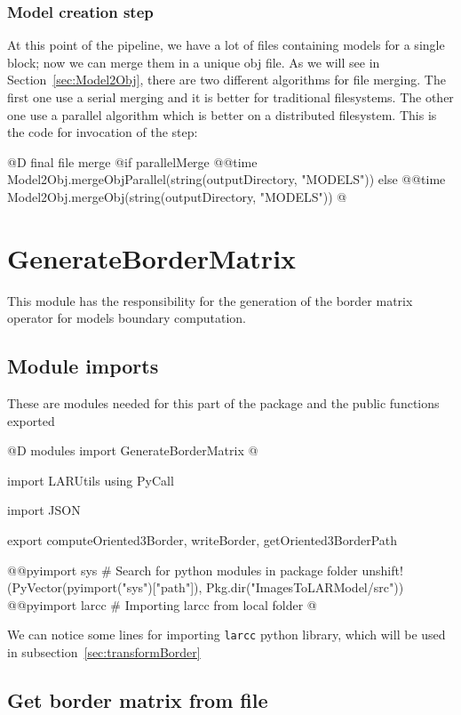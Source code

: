 \documentclass[11pt,oneside]{article}	%
\begin{document}
\subsubsection{Model creation step}\label{sec:mergeStep}

At this point of the pipeline, we have a lot of files containing models for a single block; now we can merge them in a unique obj file. As we will see in Section~\ref{sec:Model2Obj}, there are two different algorithms for file merging. The first one use a serial merging and it is better for traditional filesystems. The other one use a parallel algorithm which 
is better on a distributed filesystem. This is the code for invocation of the step:

@D final file merge
@{if parallelMerge
  @@time Model2Obj.mergeObjParallel(string(outputDirectory, "MODELS"))
else
  @@time Model2Obj.mergeObj(string(outputDirectory, "MODELS")) @}

\section{GenerateBorderMatrix}\label{sec:GenerateBorderMatrix}
This module has the responsibility for the generation of the border matrix operator for models boundary computation.

\subsection{Module imports}\label{sec:importsBorderMatrix}

These are modules needed for this part of the package and the public functions exported

@D modules import GenerateBorderMatrix
@{import LARUtils
using PyCall

import JSON

export computeOriented3Border, writeBorder, getOriented3BorderPath

@@pyimport sys
# Search for python modules in package folder
unshift!(PyVector(pyimport("sys")["path"]), Pkg.dir("ImagesToLARModel/src"))
@@pyimport larcc # Importing larcc from local folder
@}

We can notice some lines for importing \texttt{larcc} python library, which will be used in subsection~\ref{sec:transformBorder}

\subsection{Get border matrix from file}\label{sec:getBorderMatrix}
\end{document}

